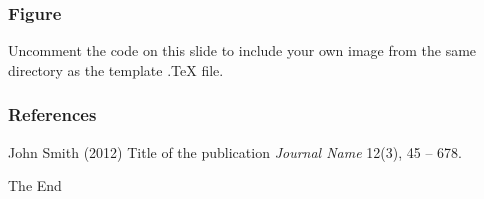 \documentclass{beamer}
\begin{document}
\begin{frame}

\end{frame}


\begin{frame}
\end{frame}


\begin{frame}
\frametitle{Figure}
Uncomment the code on this slide to include your own image from the same directory as the template .TeX file.
\end{frame}


\begin{frame}
\end{frame}


\begin{frame}
\frametitle{References}
\footnotesize{
\begin{thebibliography}{99} %
 John Smith (2012)
\newblock Title of the publication
\newblock \emph{Journal Name} 12(3), 45 -- 678.
\end{thebibliography}
}
\end{frame}


\begin{frame}
\Huge{\centerline{The End}}
\end{frame}

\end{document}
